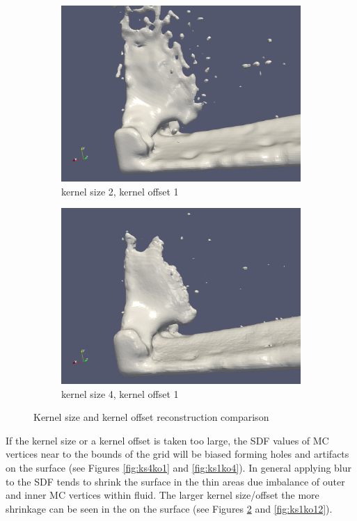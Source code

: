 \begin{figure}
\begin{subfigure}[b]{0.5\textwidth}
               \includegraphics[width=\textwidth]{figures/DBBlur_ks-2_ko-1_2.png}
               \caption{kernel size 2, kernel offset 1}
               \label{fig:ks2ko12}
        \end{subfigure}        
        \begin{subfigure}[b]{0.5\textwidth}
               \includegraphics[width=\textwidth]{figures/DBBlur_ks-4_ko-1_2.png}
               \caption{kernel size 4, kernel offset 1}
               \label{fig:ks4ko12}
        \end{subfigure}
        \caption{Kernel size and kernel offset reconstruction comparison}
        \label{fig:ksko2}
\end{figure}

If the kernel size or a kernel offset is taken too large, the SDF values of MC vertices near to the bounds of the grid will be biased forming holes and artifacts on the surface (see Figures \ref{fig:ks4ko1} and \ref{fig:ks1ko4}). In general applying blur to the SDF tends to shrink the surface in the thin areas due imbalance of outer and inner MC vertices within fluid. The larger kernel size/offset the more shrinkage can be seen in the on the surface (see Figures \ref{fig:ks4ko12} and \ref{fig:ks1ko12}).
